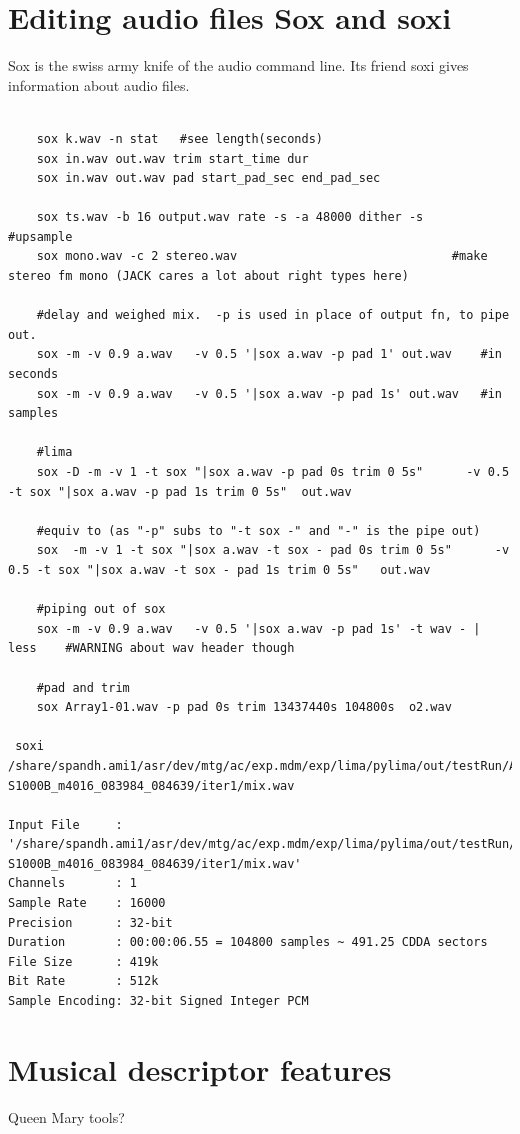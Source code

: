 \documentclass[oneside,english]{scrbook}
\begin{document}
\section{Editing audio files Sox and soxi}
Sox is the swiss army knife of the audio command line. Its friend soxi gives information about audio files.
\begin{lstlisting}

	sox k.wav -n stat   #see length(seconds)
	sox in.wav out.wav trim start_time dur			
	sox in.wav out.wav pad start_pad_sec end_pad_sec

	sox ts.wav -b 16 output.wav rate -s -a 48000 dither -s    #upsample
	sox mono.wav -c 2 stereo.wav                              #make stereo fm mono (JACK cares a lot about right types here)

	#delay and weighed mix.  -p is used in place of output fn, to pipe out.
	sox -m -v 0.9 a.wav   -v 0.5 '|sox a.wav -p pad 1' out.wav    #in seconds
	sox -m -v 0.9 a.wav   -v 0.5 '|sox a.wav -p pad 1s' out.wav   #in samples

	#lima
	sox -D -m -v 1 -t sox "|sox a.wav -p pad 0s trim 0 5s"      -v 0.5 -t sox "|sox a.wav -p pad 1s trim 0 5s"  out.wav
 
	#equiv to (as "-p" subs to "-t sox -" and "-" is the pipe out)
	sox  -m -v 1 -t sox "|sox a.wav -t sox - pad 0s trim 0 5s"      -v 0.5 -t sox "|sox a.wav -t sox - pad 1s trim 0 5s"   out.wav
	
	#piping out of sox
	sox -m -v 0.9 a.wav   -v 0.5 '|sox a.wav -p pad 1s' -t wav - | less    #WARNING about wav header though

	#pad and trim
	sox Array1-01.wav -p pad 0s trim 13437440s 104800s  o2.wav

 soxi  /share/spandh.ami1/asr/dev/mtg/ac/exp.mdm/exp/lima/pylima/out/testRun/AMI-S1000B_m4016_083984_084639/iter1/mix.wav

Input File     : '/share/spandh.ami1/asr/dev/mtg/ac/exp.mdm/exp/lima/pylima/out/testRun/AMI-S1000B_m4016_083984_084639/iter1/mix.wav'
Channels       : 1
Sample Rate    : 16000
Precision      : 32-bit
Duration       : 00:00:06.55 = 104800 samples ~ 491.25 CDDA sectors
File Size      : 419k
Bit Rate       : 512k
Sample Encoding: 32-bit Signed Integer PCM

\end{lstlisting}

\section{Musical descriptor features}
Queen Mary tools?
\end{document}
